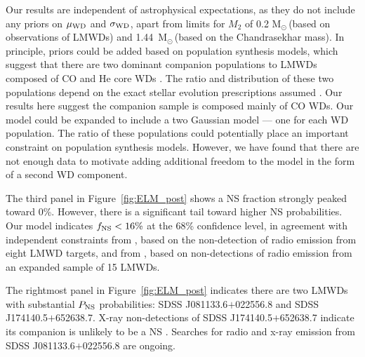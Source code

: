 \documentclass[apjl]{emulateapj}
\newcommand{\Msun}{\ifmmode {{\rm M}_{\odot}}\else M$_{\odot}$\fi}
\newcommand{\wdupper}{1.44}
\begin{document}
Our results are independent of astrophysical expectations, as they do not include any priors on $\mu_{\rm WD}$ and $\sigma_{\rm WD}$, apart from limits for $M_2$ of 0.2 \Msun\,(based on observations of LMWDs) and \wdupper~\Msun\,(based on the Chandrasekhar mass). In principle, priors could be added based on population synthesis models, which suggest that there are two dominant companion populations to LMWDs composed of CO and He core WDs \citep{han98}. The ratio and distribution of these two populations depend on the exact stellar evolution prescriptions assumed \citep[see discussion in, e.g., ][]{toonen12}. Our results here suggest the companion sample is composed mainly of CO WDs. Our model could be expanded to include a two Gaussian model --- one for each WD population. The ratio of these populations could potentially place an important constraint on population synthesis models. However, we have found that there are not enough data to motivate adding additional freedom to the model in the form of a second WD component.


The third panel in Figure~\ref{fig:ELM_post} shows a NS fraction strongly peaked toward 0\%. However, there is a significant tail toward higher NS probabilities. Our model indicates $f_{\rm NS} <16\%$ at the 68\% confidence level, in agreement with independent constraints from \citet[][$f_{\rm NS}<18\pm5$\%]{vLeeuwen07}, based on the non-detection of radio emission from eight LMWD targets, and from \citet[][$f_{\rm NS}<10\substack{+4 \\ -2}~\%$]{agueros09b}, based on non-detections of radio emission from an expanded sample of 15 LMWDs. 


The rightmost panel in Figure~\ref{fig:ELM_post} indicates there are two LMWDs with substantial $P_{\rm NS}$ probabilities: SDSS J081133.6$+$022556.8 and SDSS J174140.5$+$652638.7. X-ray non-detections of SDSS J174140.5$+$652638.7 indicate its companion is unlikely to be a NS \citep{kilic14}. Searches for radio and x-ray emission from SDSS J081133.6$+$022556.8 are ongoing.

\end{document}
